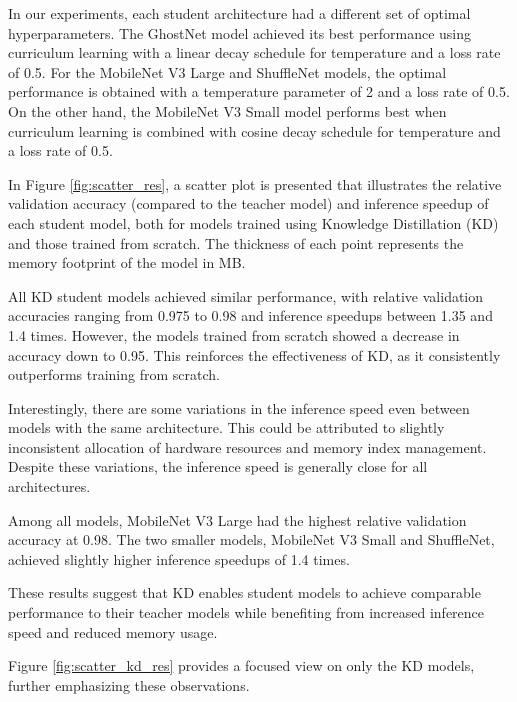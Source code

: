 \documentclass{article}
\begin{document}
In our experiments, each student architecture had a different set of optimal hyperparameters. The GhostNet model achieved its best performance using curriculum learning with a linear decay schedule for temperature and a loss rate of 0.5. For the MobileNet V3 Large and ShuffleNet models, the optimal performance is obtained with a temperature parameter of 2 and a loss rate of 0.5. On the other hand, the MobileNet V3 Small model performs best when curriculum learning is combined with cosine decay schedule for temperature and a loss rate of 0.5.

In Figure \ref{fig:scatter_res}, a scatter plot is presented that illustrates the relative validation accuracy (compared to the teacher model) and inference speedup of each student model, both for models trained using Knowledge Distillation (KD) and those trained from scratch. The thickness of each point represents the memory footprint of the model in MB.

All KD student models achieved similar performance, with relative validation accuracies ranging from 0.975 to 0.98 and inference speedups between 1.35 and 1.4 times. However, the models trained from scratch showed a decrease in accuracy down to 0.95. This reinforces the effectiveness of KD, as it consistently outperforms training from scratch.

Interestingly, there are some variations in the inference speed even between models with the same architecture. This could be attributed to slightly inconsistent allocation of hardware resources and memory index management. Despite these variations, the inference speed is generally close for all architectures.

Among all models, MobileNet V3 Large had the highest relative validation accuracy at 0.98. The two smaller models, MobileNet V3 Small and ShuffleNet, achieved slightly higher inference speedups of 1.4 times.

These results suggest that KD enables student models to achieve comparable performance to their teacher models while benefiting from increased inference speed and reduced memory usage.

Figure \ref{fig:scatter_kd_res} provides a focused view on only the KD models, further emphasizing these observations.
\end{document}
